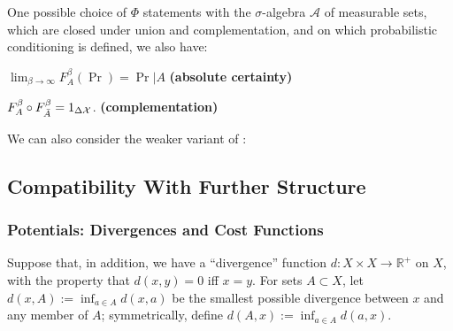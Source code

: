 \documentclass{article}
\DeclareMathOperator{\supp}{\mathrm{Supp}}
\begin{document}

One possible choice of $\Phi$ statements with the $\sigma$-algebra $\mathcal A$ of measurable sets, which are closed under union and complementation, and on which probabilistic conditioning is defined, we also have:

\begin{URaxioms}
    \item $\displaystyle \lim_{\beta\to\infty} F^\beta_A (\Pr) = \Pr|A$
    \hfill \textbf{(absolute certainty)} \label{ax:certainty}


    \item
    $F^\beta_A \circ F_{\bar A}^\beta = 1_{\Delta\mathcal X}$.
        \hfill \textbf{(complementation)} \label{ax:comp}
\end{URaxioms}


We can also consider the weaker variant of :



\subsection{Compatibility With Further Structure}
\subsubsection*{Potentials: Divergences and Cost Functions}
Suppose that, in addition, we have a ``divergence'' function $d : X \times X \to \mathbb R^+$ on $X$, with the property that $d(x,y) = 0$ iff $x = y$.
For sets $A \subset X$, let $d(x, A) := \inf_{a \in A} d(x,a)$ be the smallest possible divergence between $x$ and any member of $A$; symmetrically, define $d(A, x) := \inf_{a \in A} d(a,x)$.
\end{document}
